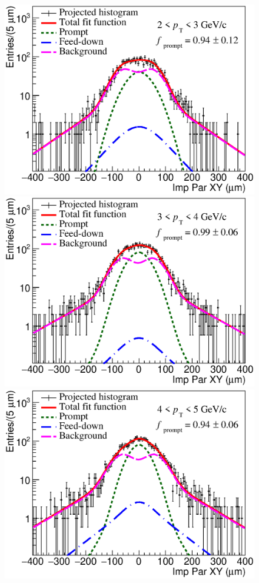 \documentclass[b5paper,10pt,twoside,oldstyle,classica]{toptesi}
\begin{document}
\begin{figure}[h]
\begin{center}
{\includegraphics[scale = 0.25]{FitUnbinned_2-3_bkg_plot.eps}}
\hspace{0cm}
{\includegraphics[scale = 0.25]{FitUnbinned_3-4_bkg_plot.eps}}
\vspace{0cm}
{\includegraphics[scale = 0.25]{FitUnbinned_4-5_bkg_plot.eps}}

\end{center}
\end{figure}
\end{document}
